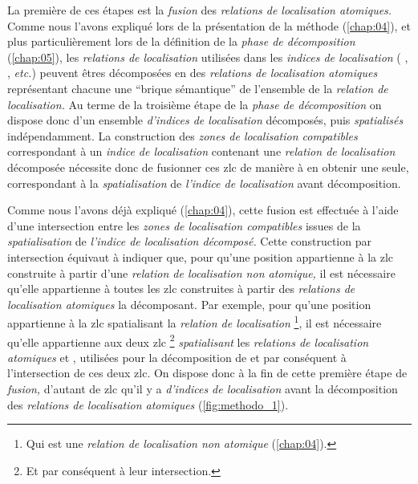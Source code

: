 La première de ces étapes est la \emph{fusion} des \emph{relations de
  localisation atomiques.} Comme nous l'avons expliqué lors de la
présentation de la méthode (\autoref{chap:04}), et plus
particulièrement lors de la définition de la \emph{phase de
  décomposition} (\autoref{chap:05}), les \emph{relations de
  localisation} utilisées dans les \emph{indices de localisation} (\eg
{}, , \emph{etc.})
peuvent êtres décomposées en des \emph{relations de localisation
  atomiques} représentant chacune une \enquote{brique sémantique} de
l'ensemble de la \emph{relation de localisation.} Au terme de la
troisième étape de la \emph{phase de décomposition} on dispose donc
d'un ensemble \emph{d'indices de localisation} décomposés, puis
\emph{spatialisés} indépendamment. La construction des \emph{zones de
  localisation compatibles} correspondant à un \emph{indice de
  localisation} contenant une \emph{relation de localisation}
décomposée nécessite donc de fusionner ces \ac{zlc} de manière à en
obtenir une seule, correspondant à la \emph{spatialisation} de
\emph{l'indice de localisation} avant décomposition.

Comme nous l'avons déjà expliqué (\autoref{chap:04}), cette fusion est
effectuée à l'aide d'une intersection entre les \emph{zones de
  localisation compatibles} issues de la \emph{spatialisation} de
\emph{l'indice de localisation décomposé.} Cette construction par
intersection équivaut à indiquer que, pour qu'une position appartienne
à la \ac{zlc} construite à partir d'une \emph{relation de localisation
  non atomique,} il est nécessaire qu'elle appartienne à toutes les
\ac{zlc} construites à partir des \emph{relations de localisation
  atomiques} la décomposant. Par exemple, pour qu'une position
appartienne à la \ac{zlc} spatialisant la \emph{relation de
  localisation}  \footnote{Qui est une
  \emph{relation de localisation non atomique} (\autoref{chap:04}).},
il est nécessaire qu'elle appartienne aux deux \ac{zlc} \footnote{Et
  par conséquent à leur intersection.} \emph{spatialisant} les
\emph{relations de localisation atomiques} 
et , utilisées pour la décomposition de
 et par conséquent à l'intersection de
ces deux \ac{zlc}.
%
On dispose donc à la fin de cette première étape de \emph{fusion,}
d'autant de \ac{zlc} qu'il y a \emph{d'indices de localisation} avant
la décomposition des \emph{relations de localisation atomiques}
(\autoref{fig:methodo_1}).

